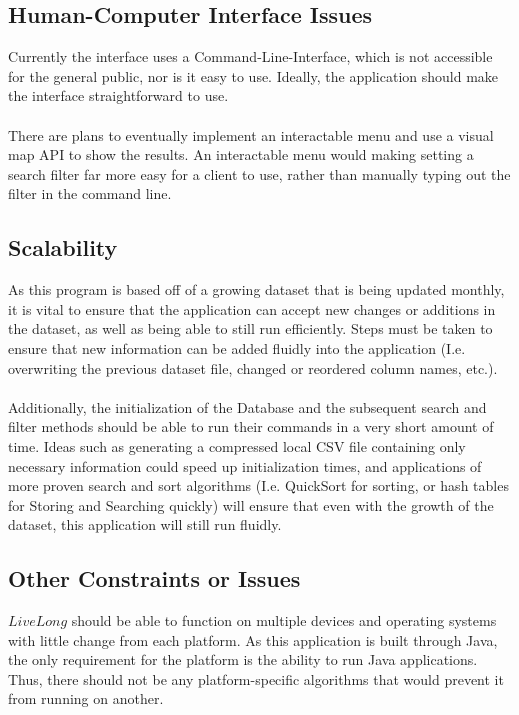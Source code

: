 \documentclass[12pt]{article}
\begin{document}
\subsection{Human-Computer Interface Issues}
Currently the interface uses a Command-Line-Interface, which is not accessible for the general public, nor is it easy to use. Ideally, the application should make the interface straightforward to use. \\ \\
There are plans to eventually implement an interactable menu and use a visual map API to show the results. An interactable menu would making setting a search filter far more easy for a client to use, rather than manually typing out the filter in the command line.

\subsection{Scalability}
As this program is based off of a growing dataset that is being updated monthly, it is vital to ensure that the application can accept new changes or additions in the dataset, as well as being able to still run efficiently. Steps must be taken to ensure that new information can be added fluidly into the application (I.e. overwriting the previous dataset file, changed or reordered column names, etc.). \\ \\
Additionally, the initialization of the Database and the subsequent search and filter methods should be able to run their commands in a very short amount of time. Ideas such as generating a compressed local CSV file containing only necessary information could speed up initialization times, and applications of more proven search and sort algorithms (I.e. QuickSort for sorting, or hash tables for Storing and Searching quickly) will ensure that even with the growth of the dataset, this application will still run fluidly.

\subsection{Other Constraints or Issues}
$LiveLong$ should be able to function on multiple devices and operating systems with little change from each platform. As this application is built through Java, the only requirement for the platform is the ability to run Java applications. Thus, there should not be any platform-specific algorithms that would prevent it from running on another. 
\end{document}
